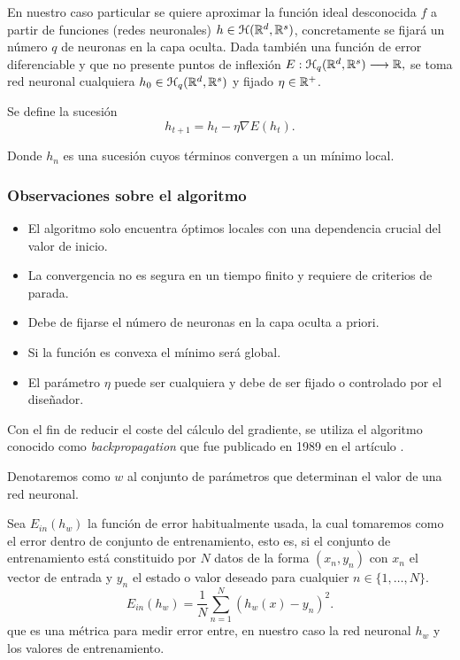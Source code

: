 En nuestro caso particular se quiere aproximar la función ideal desconocida $f$ a partir de funciones (redes neuronales) $h \in \mathcal{H}(\mathbb{R}^d,\mathbb{R}^s)$, concretamente se fijará un número $q$ de neuronas en la capa oculta. 
Dada también una función de error diferenciable y que no presente puntos de inflexión
$E: \mathcal{H}_q (\mathbb{R}^d, \mathbb{R}^s) \longrightarrow \mathbb{R},$
se toma red neuronal cualquiera $h_0 \in \mathcal{H}_q (\mathbb{R}^d, \mathbb{R}^s)$ y 
fijado $\eta \in \mathbb{R}^+$. 

Se define la sucesión 
\begin{equation}\label{eq:descenso-gradiente}
    h_{t+1}  = h_t - \eta \nabla E(h_t).
\end{equation}  

Donde $h_n$ es una sucesión cuyos términos convergen a un mínimo local.
\subsubsection*{Observaciones sobre el algoritmo }

\begin{itemize}
    \item El algoritmo solo encuentra óptimos locales con una dependencia crucial del valor de inicio. 
    \item La convergencia no es segura en un tiempo finito y requiere de criterios de parada. 
    \item Debe de fijarse el número de neuronas en la capa oculta a priori.
    \item Si la función es convexa el mínimo será global.
    \item El parámetro $\eta$ puede ser cualquiera y debe de ser fijado o controlado por el diseñador.  
\end{itemize}


Con el fin de reducir el coste del cálculo del gradiente, 
se utiliza el algoritmo conocido como \textit{backpropagation} que fue publicado en 
1989 en el artículo \cite{backpropagation-Hinton}. 

Denotaremos como $w$ al conjunto de parámetros que determinan el valor de una red neuronal. 

Sea $E_{in}(h_w)$ la función de error habitualmente usada, la cual tomaremos como el error dentro de conjunto de entrenamiento, esto es,  si el conjunto 
de entrenamiento está constituido por $N$ datos de la forma $(x_n, y_n)$ con $x_n$ el vector de entrada y $y_n$ el estado o valor deseado para cualquier $n\in \{1, \ldots, N\}.$
\begin{equation}
    E_{in}(h_w) = \frac{1}{N} \sum^N_{n=1} (h_w(x)- y_n)^2. 
\end{equation}
que es una métrica para medir error entre, en nuestro caso  
la red neuronal $h_w$ y los valores de entrenamiento.

